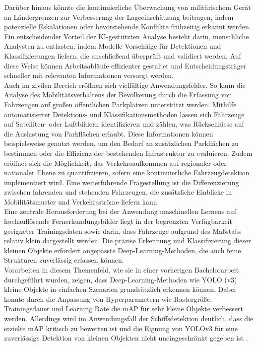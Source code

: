 Darüber hinaus könnte die kontinuierliche Überwachung von militärischem Gerät an Ländergrenzen zur Verbesserung der Lageeinschätzung beitragen, indem potenzielle Eskalationen oder bevorstehende Konflikte frühzeitig erkannt werden. Ein entscheidender Vorteil der KI-gestützten Analyse besteht darin, menschliche Analysten zu entlasten, indem Modelle Vorschläge für Detektionen und Klassifizierungen liefern, die anschließend überprüft und validiert werden. Auf diese Weise können Arbeitsabläufe effizienter gestaltet und Entscheidungsträger schneller mit relevanten Informationen versorgt werden. \\

Auch im zivilen Bereich eröffnen sich vielfältige Anwendungsfelder. So kann die Analyse des Mobilitätsverhaltens der Bevölkerung durch die Erfassung von Fahrzeugen auf großen öffentlichen Parkplätzen unterstützt werden. Mithilfe automatisierter Detektions- und Klassifikationsmethoden lassen sich Fahrzeuge auf Satelliten- oder Luftbildern identifizieren und zählen, was Rückschlüsse auf die Auslastung von Parkflächen erlaubt. Diese Informationen können beispielsweise genutzt werden, um den Bedarf an zusätzlichen Parkflächen zu bestimmen oder die Effizienz der bestehenden Infrastruktur zu evaluieren. Zudem eröffnet sich die Möglichkeit, das Verkehrsaufkommen auf regionaler oder nationaler Ebene zu quantifizieren, sofern eine kontinuierliche Fahrzeugdetektion implementiert wird. Eine weiterführende Fragestellung ist die Differenzierung zwischen fahrenden und stehenden Fahrzeugen, die zusätzliche Einblicke in Mobilitätsmuster und Verkehrsströme liefern kann. \\

Eine zentrale Herausforderung bei der Anwendung maschinellen Lernens auf hochauflösende Fernerkundungsbilder liegt in der begrenzten Verfügbarkeit geeigneter Trainingsdaten sowie darin, dass Fahrzeuge aufgrund des Maßstabs relativ klein dargestellt werden. Die präzise Erkennung und Klassifizierung dieser kleinen Objekte erfordert angepasste Deep-Learning-Methoden, die auch feine Strukturen zuverlässig erfassen können. \\

Vorarbeiten in diesem Themenfeld, wie sie in einer vorherigen Bachelorarbeit durchgeführt wurden, zeigen, dass Deep-Learning-Methoden wie \acrfull{YOLO} (v3) kleine Objekte in einfachen Szenarien grundsätzlich erkennen können. Dabei konnte durch die Anpassung von Hyperparametern wie Rastergröße, Trainingsdauer und Learning Rate die \acrfull{mAP} für sehr kleine Objekte verbessert werden. Allerdings wird im Anwendungsfall der Schiffsdetektion deutlich, dass die erzielte mAP kritisch zu bewerten ist und die Eignung von YOLOv3 für eine zuverlässige Detektion von kleinen Objekten nicht uneingeschränkt gegeben ist \cite{Balzer2022}. \\

